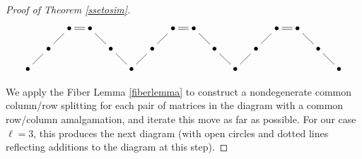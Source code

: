 \documentclass{amsart}
\theoremstyle{definition}
\theoremstyle{remark}
\numberwithin{equation}{section}
\begin{document}
{{\begin{proof}[Proof of Theorem 
\ref{ssetosim}]
\begin{equation}
\xymatrix@=10pt{
     &                        & \bullet  \ar@{-}[dl] \ar@{=}[r] & \bullet \ar@{-}[dr] &                & 
    &                        & \bullet  \ar@{-}[dl] \ar@{=}[r] & \bullet \ar@{-}[dr] &                & 
    &                        & \bullet  \ar@{-}[dl] \ar@{=}[r] & \bullet \ar@{-}[dr] &                & \\
    & \bullet        \ar@{-}[dl] &                             &               & \bullet \ar@{-}[dr] &  
    & \bullet        \ar@{-}[dl] &                             &               & \bullet \ar@{-}[dr] &  
    & \bullet        \ar@{-}[dl] &                             &               & \bullet \ar@{-}[dr] &  \\
 \bullet &                    &                             &               &                 &   \bullet
         &                    &                             &               &                 &   \bullet 
          &                    &                             &               &                 &   \bullet 
}
\end{equation} 

We apply the Fiber Lemma \ref{fiberlemma} to construct a 
nondegenerate common column/row splitting for each
pair of  matrices in the diagram with a common row/column 
amalgamation, and iterate this move
as far as possible. For our case $\ell =3$, this produces 
the next diagram (with open circles 
and dotted lines reflecting additions to the diagram at this step). 



\end{proof}}}
\end{document}
